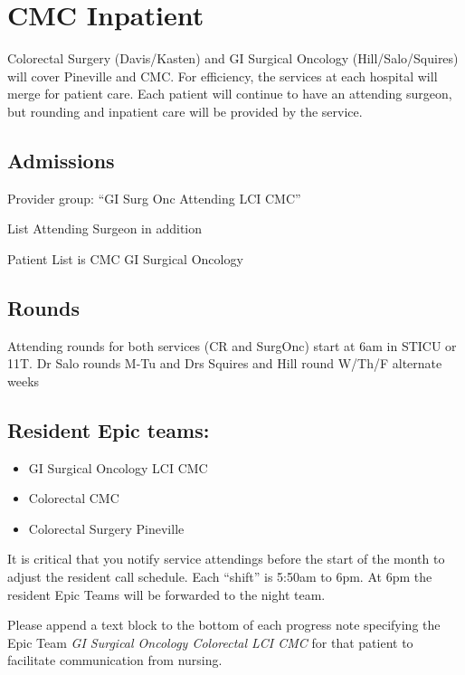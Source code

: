 \documentclass[
]{book}
\providecommand{\tightlist}{%
  \setlength{\itemsep}{0pt}\setlength{\parskip}{0pt}}
\begin{document}
\hypertarget{cmc-inpatient}{%
\chapter{CMC Inpatient}\label{cmc-inpatient}}

Colorectal Surgery (Davis/Kasten) and GI Surgical Oncology (Hill/Salo/Squires) will cover Pineville and CMC. For efficiency, the services at each hospital will merge for patient care. Each patient will continue to have an attending surgeon, but rounding and inpatient care will be provided by the service.

\hypertarget{admissions}{%
\section{Admissions}\label{admissions}}

Provider group: ``GI Surg Onc Attending LCI CMC''

List Attending Surgeon in addition

Patient List is CMC GI Surgical Oncology

\hypertarget{rounds}{%
\section{Rounds}\label{rounds}}

Attending rounds for both services (CR and SurgOnc) start at 6am in STICU or 11T. Dr Salo rounds M-Tu and Drs Squires and Hill round W/Th/F alternate weeks

\hypertarget{resident-epic-teams}{%
\section{Resident Epic teams:}\label{resident-epic-teams}}

\begin{itemize}
\tightlist
\item
  GI Surgical Oncology LCI CMC
\item
  Colorectal CMC
\item
  Colorectal Surgery Pineville
\end{itemize}

It is critical that you notify service attendings before the start of the month to adjust the resident call schedule. Each ``shift'' is 5:50am to 6pm. At 6pm the resident Epic Teams will be forwarded to the night team.

Please append a text block to the bottom of each progress note specifying the Epic Team \emph{GI Surgical Oncology Colorectal LCI CMC} for that patient to facilitate communication from nursing.
\end{document}
